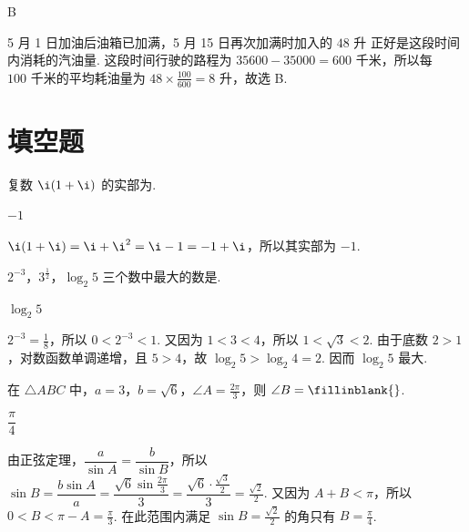 \begin{answer}
B
\end{answer}

\begin{solution}
5 月 1 日加油后油箱已加满，5 月 15 日再次加满时加入的 \(48\text{ 升}\) 正好是这段时间内消耗的汽油量. 这段时间行驶的路程为 \(35600-35000=600\text{ 千米}\)，所以每 \(100\text{ 千米}\)的平均耗油量为 \(48\times\frac{100}{600}=8\text{ 升}\)，故选 B.
\end{solution}

\section{填空题}

\begin{problem}
复数 \(\i(1+\i)\) 的实部为\fillinblank{}.
\end{problem}

\begin{answer}
\(-1\)
\end{answer}

\begin{solution}
\(\i(1+\i)=\i+\i^2=\i-1=-1+\i\)，所以其实部为 \(-1\).
\end{solution}

\begin{problem}
\(2^{-3}\)，\(3^{\frac{1}{2}}\)，\(\log_2 5\) 三个数中最大的数是\fillinblank{}.
\end{problem}

\begin{answer}
\(\log_2 5\)
\end{answer}

\begin{solution}
\(2^{-3}=\frac18\)，所以 \(0<2^{-3}<1\). 又因为 \(1<3<4\)，所以 \(1<\sqrt{3}<2\). 由于底数 \(2>1\)，对数函数单调递增，且 \(5>4\)，故 \(\log_2 5>\log_2 4=2\). 因而 \(\log_2 5\) 最大.
\end{solution}

\begin{problem}
在 \(\triangle ABC\) 中，\(a = 3\)，\(b = \sqrt{6}\)，\(\angle A = \frac{2\pi}{3}\)，则 \(\angle B =\fillinblank{}\).
\end{problem}

\begin{answer}
\(\dfrac{\pi}{4}\)
\end{answer}

\begin{solution}
由正弦定理，\(\dfrac{a}{\sin A}=\dfrac{b}{\sin B}\)，所以
\(\sin B=\dfrac{b\sin A}{a}=\dfrac{\sqrt{6}\sin\frac{2\pi}{3}}{3}=\dfrac{\sqrt{6}\cdot\frac{\sqrt{3}}2}{3}=\frac{\sqrt{2}}2\). 又因为 \(A+B<\pi\)，所以 \(0<B<\pi-A=\frac{\pi}{3}\). 在此范围内满足 \(\sin B=\frac{\sqrt2}{2}\) 的角只有 \(B=\frac{\pi}{4}\).
\end{solution}

